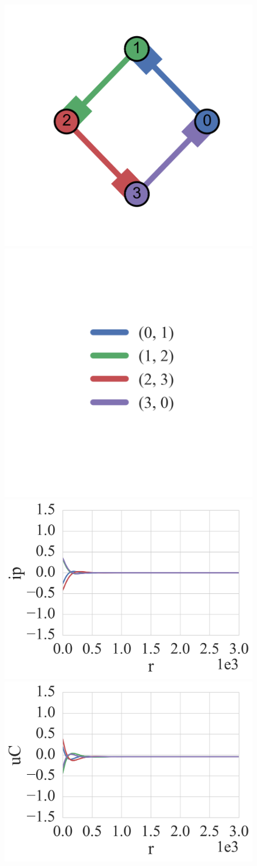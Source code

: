 \documentclass{standalone}
\begin{document}
  \begin{minipage}[t]{\textwidth}

  \begin{figure}
      \centering
      \includegraphics[width=0.4\linewidth,keepaspectratio,trim={0 3cm 0 2cm},clip]{./pics/cycle/cycle_4.png}%
      \qquad
      \includegraphics[width=0.4\linewidth,keepaspectratio,trim={0 3cm 0 2cm},clip]{./pics/cycle/cycle_4_legend.png}
      \vfill
      \includegraphics[width=0.4\linewidth,keepaspectratio]{./pics/cycle/cycle_4_ip_zero.png}
      \qquad
      \includegraphics[width=0.4\linewidth,keepaspectratio]{./pics/cycle/cycle_4_uC_zero.png}
  \end{figure}

  \end{minipage}
\end{document}
